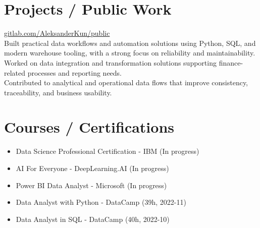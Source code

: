 \documentclass[a4paper,11pt]{article}
\begin{document}
\section*{Projects / Public Work}
\href{https://gitlab.com/AleksanderKun/public}{gitlab.com/AleksanderKun/public}\\
Built practical data workflows and automation solutions using Python, SQL, and modern warehouse tooling, with a strong focus on reliability and maintainability.\\
Worked on data integration and transformation solutions supporting finance-related processes and reporting needs.\\
Contributed to analytical and operational data flows that improve consistency, traceability, and business usability.

\section*{Courses / Certifications}
\begin{itemize}
  \item Data Science Professional Certification - IBM (In progress)
  \item AI For Everyone - DeepLearning.AI (In progress)
  \item Power BI Data Analyst - Microsoft (In progress)
  \item Data Analyst with Python - DataCamp (39h, 2022-11)
  \item Data Analyst in SQL - DataCamp (40h, 2022-10)
\end{itemize}
\end{document}
